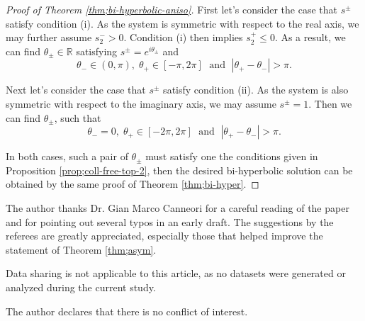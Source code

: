 \documentclass[11pt]{amsart}
\newcommand{\rr}{\mathbb R}
\newcommand{\tht}{\theta}
\theoremstyle{plain}
\theoremstyle{definition}
\theoremstyle{remark}
\begin{document}
\begin{proof}[Proof of Theorem \ref{thm;bi-hyperbolic-aniso}]

First let's consider the case that $s^{\pm}$ satisfy condition (i). As the system is symmetric with respect to the real axis, we may further assume $s^-_2 >0$. Condition (i) then implies $s^+_2 \le 0$. As a result, we can find $\tht_{\pm} \in \rr$ satisfying $s^{\pm}=e^{i\tht_{\pm}}$ and
$$  \tht_- \in (0, \pi), \; \tht_+ \in [-\pi, 2\pi] \; \text{ and } \; |\tht_+ -\tht_-| >\pi.
$$

Next let's consider the case that $s^{\pm}$ satisfy condition (ii). As the system is also symmetric with respect to the imaginary axis, we may assume $s^{\pm}=1$.  Then we can find $\tht_{\pm}$, such that 
$$ \tht_-=0, \; \tht_+ \in [-2\pi, 2\pi] \; \text{ and } \; |\tht_+ -\tht_-| >\pi. $$

In both cases, such a pair of $\tht_{\pm}$ must satisfy one the conditions given in Proposition \ref{prop;coll-free-top-2}, then the desired bi-hyperbolic solution can be obtained by the same proof of Theorem \ref{thm;bi-hyper}. 

\end{proof}


\hfill\newline
{} The author thanks Dr. Gian Marco Canneori for a careful reading of the paper and for pointing out several typos in an early draft. The suggestions by the referees are greatly appreciated, especially those that helped improve the statement of Theorem \ref{thm;asym}.


\hfill\newline
{} Data sharing is not applicable to this article, as no datasets were generated or analyzed during the current study.

\hfill\newline
{} The author declares that there is no conflict of interest.



\hfill\newline

%

\end{document}
